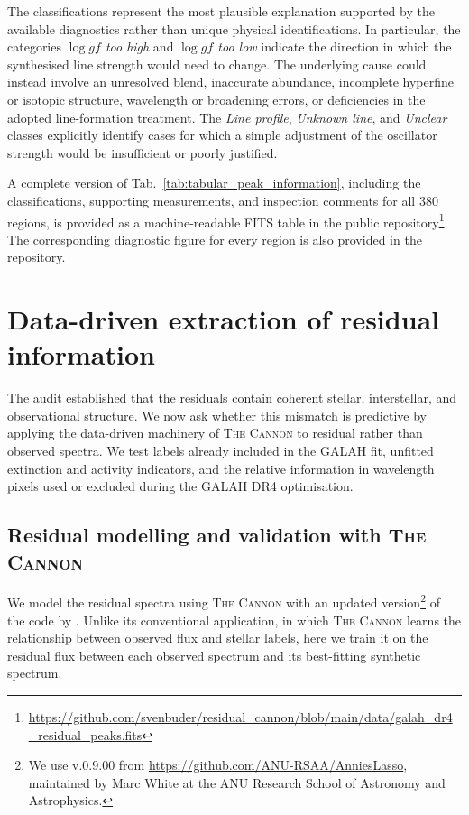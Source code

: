 \documentclass[twocolumn,apj,numberedappendix,appendixfloats]{openjournal}
\begin{document}
The classifications represent the most plausible explanation supported by the available diagnostics rather than unique physical identifications. In particular, the categories \textit{$\log gf$ too high} and \textit{$\log gf$ too low} indicate the direction in which the synthesised line strength would need to change. The underlying cause could instead involve an unresolved blend, inaccurate abundance, incomplete hyperfine or isotopic structure, wavelength or broadening errors, or deficiencies in the adopted line-formation treatment. The \textit{Line profile}, \textit{Unknown line}, and \textit{Unclear} classes explicitly identify cases for which a simple adjustment of the oscillator strength would be insufficient or poorly justified.

A complete version of Tab.~\ref{tab:tabular_peak_information}, including the classifications, supporting measurements, and inspection comments for all 380 regions, is provided as a machine-readable FITS table in the public repository\footnote{\url{https://github.com/svenbuder/residual_cannon/blob/main/data/galah_dr4_residual_peaks.fits}}. The corresponding diagnostic figure for every region is also provided in the repository.

\section{Data-driven extraction of residual information}
\label{sec:analysis_cannon}

The audit established that the residuals contain coherent stellar, interstellar, and observational structure. We now ask whether this mismatch is predictive by applying the data-driven machinery of \textsc{The Cannon} to residual rather than observed spectra. We test labels already included in the GALAH fit, unfitted extinction and activity indicators, and the relative information in wavelength pixels used or excluded during the GALAH DR4 optimisation.

\subsection{Residual modelling and validation with \textsc{The Cannon}}
\label{sec:analysis_cannon_method}

We model the residual spectra using \textsc{The Cannon} \citep{Ness2015} with an updated version\footnote{We use v.0.9.00 from \url{https://github.com/ANU-RSAA/AnniesLasso}, maintained by Marc White at the ANU Research School of Astronomy and Astrophysics.} of the code by \citet{Casey2016}. Unlike its conventional application, in which \textsc{The Cannon} learns the relationship between observed flux and stellar labels, here we train it on the residual flux between each observed spectrum and its best-fitting synthetic spectrum.
\end{document}
